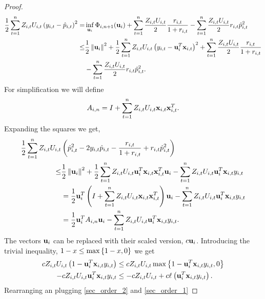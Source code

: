 \begin{proof}
\begin{equation*}
\begin{split}
\frac{1}{2} \sum_{t=1}^{n}Z_{i,t}U_{i,t}\left({y_{i,t}-\hat{p}_{i,t}}\right)^{2}=& \inf_{\mathbf{u}_i}{\Phi_{i,n+1}}(\mathbf{u}_i)+ \sum_{t=1}^{n}\frac{Z_{i,t}U_{i,t}}{2}\frac{r_{i,t}}{1+r_{i,t}}-\sum_{t=1}^{n}\frac{Z_{i,t}U_{i,t}}{2}r_{i,t}\hat{p}_{i,t}^2\\
\le&\frac{1}{2}\left\Vert {\mathbf{u}_i} \right\Vert^2+\frac{1}{2}\sum_{t=1}^{n}{Z_{i,t}U_{i,t}\left({y_{i,t}-\mathbf{u}_i^T\mathbf{x}_{i,t}}\right)}^2+ \sum_{t=1}^{n}\frac{Z_{i,t}U_{i,t}}{2}\frac{r_{i,t}}{1+r_{i,t}}\\&-\sum_{t=1}^{n}\frac{Z_{i,t}U_{i,t}}{2}r_{i,t}\hat{p}_{i,t}^2.
\end{split}
\end{equation*} 
For simplification we will define
\begin{equation*}
A_{i,n}=I+\sum_{t=1}^{n}{Z_{i,t}U_{i,t}}\mathbf{x}_{i,t}\mathbf{x}_{i,t}^T.
\end{equation*}
Expanding the squares we get,
\begin{equation}
\begin{split}
\frac{1}{2} \sum_{t=1}^{n}Z_{i,t}U_{i,t}&\left({\hat{p}_{i,t}^2-2y_{i,t}\hat{p}_{i,t}-\frac{r_{i,t}}{1+r_{i,t}}+r_{i,t}\hat{p}_{i,t}^2}\right)\\
\le& \frac{1}{2}\left\Vert {\mathbf{u}_i} \right\Vert^2+\frac{1}{2}\sum_{t=1}^{n}{Z_{i,t}U_{i,t}\mathbf{u}_i^T\mathbf{x}_{i,t}\mathbf{x}_{i,t}^T\mathbf{u}_i}-\sum_{t=1}^{n}{Z_{i,t}U_{i,t}\mathbf{u}_i^T\mathbf{x}_{i,t}y_{i,t}}\\
&=\frac{1}{2} \mathbf{u}_i^T\left({I+\sum_{t=1}^{n}{Z_{i,t}U_{i,t}}\mathbf{x}_{i,t}\mathbf{x}_{i,t}^T}\right)\mathbf{u}_i-\sum_{t=1}^{n}{Z_{i,t}U_{i,t}\mathbf{u}_i^T\mathbf{x}_{i,t}y_{i,t}}\\
&=\frac{1}{2} \mathbf{u}_i^T A_{i,n} \mathbf{u}_i-\sum_{t=1}^{n}{Z_{i,t}U_{i,t}\mathbf{u}_i^T\mathbf{x}_{i,t}y_{i,t}}.
\end{split}
\label{sec_order_1}
\end{equation} 
The vectors $\mathbf{u}_i$ can be replaced with their scaled version, $c\mathbf{u}_i$. 
Introducing the trivial inequality, $1-x\le \max\left\{{1-x,0}\right\}$ we get 
\begin{equation}
\begin{split}
cZ_{i,t}U_{i,t}\left({1-\mathbf{u}_i^T\mathbf{x}_{i,t}y_{i,t}}\right) &\le cZ_{i,t}U_{i,t}\max\left\{{1-\mathbf{u}_i^T\mathbf{x}_{i,t}y_{i,t},0}\right\}\\
-cZ_{i,t}U_{i,t}\mathbf{u}_i^T\mathbf{x}_{i,t}y_{i,t}&\le-cZ_{i,t}U_{i,t}+c \ell_{}\left({\mathbf{u}_i^T\mathbf{x}_{i,t}y_{i,t}}\right).
\label{sec_order_2}
\end{split}
\end{equation}
Rearranging an plugging \eqref{sec_order_2} and \eqref{sec_order_1} 


\end{proof}
